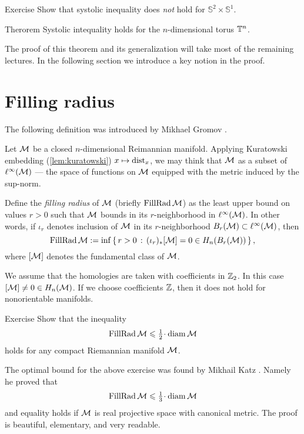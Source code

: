 \begin{thm}{Exercise}\label{ex:sysS2xS1}
Show that systolic inequality does \emph{not} hold for $\mathbb{S}^2\times\mathbb{S}^1$.
\end{thm}


\begin{thm}{Therorem}\label{thm:sys(torus)}
Systolic intequality holds for the $n$-dimensional torus $\mathbb{T}^n$. 
\end{thm}

The proof of this theorem and its generalization will take most of the remaining lectures.
In the following section we introduce a key notion in the proof.

\section{Filling radius}

The following definition was introduced by Mikhael Gromov \cite{gromov-1983}.

Let $\mathcal{M}$ be a closed $n$-dimensional Reimannian manifold.
Applying Kuratowski embedding (\ref{lem:kuratowski}) $x\mapsto \mathrm{dist}_x$, we may think that $\mathcal{M}$ as a subset of $\ell^\infty(\mathcal{M})$ --- the space of functions on $\mathcal{M}$ equipped with the metric induced by the sup-norm.

Define the \emph{filling radius} of $\mathcal{M}$ (briefly $\operatorname{\rm FillRad}\mathcal{M}$) as the least upper bound on values $r>0$ such that $\mathcal{M}$ bounds in its $r$-neighborhood in $\ell^\infty(\mathcal{M})$.
In other words, if $\iota_r$ denotes inclusion of $\mathcal{M}$ in its $r$-neighborhood $B_r(\mathcal{M})\subset \ell^\infty(\mathcal{M})$,
then 
\[\operatorname{\rm FillRad}\mathcal{M}\mathrel{:=}\inf\left\{\,{r>0}\,:\,{(\iota_r)_*[\mathcal{M}]=0\in H_n(B_r(\mathcal{M}))}\,\right\},\]
where $[\mathcal{M}]$ denotes the fundamental class of $\mathcal{M}$.

We assume that the homologies are taken with coefficients in $\mathbb{Z}_2$.
In this case $[\mathcal{M}]\ne0\in H_n(\mathcal{M})$.
If we choose coefficients $\mathbb{Z}$, then it does not hold for nonorientable manifolds.


\begin{thm}{Exercise}\label{ex:fillrad<diam/2}
Show that the inequality
\[\FillRad \spc{M}\le \tfrac12\cdot\diam \spc{M}\]
holds for any compact Riemannian manifold $\mathcal{M}$.
\end{thm}

The optimal bound for the above exercise was found by Mikhail Katz \cite{katz}.
Namely he proved that
\[\FillRad \spc{M}\le \tfrac13\cdot\diam \spc{M}\]
and equality holds if $\mathcal{M}$ is real projective space with canonical metric.
The proof is beautiful, elementary, and very readable.

